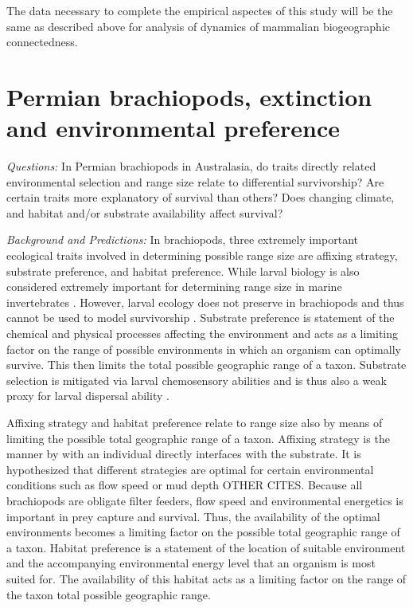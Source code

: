 \documentclass[12pt,letterpaper]{article}
\begin{document}
The data necessary to complete the empirical aspectes of this study will be the same as described above for analysis of dynamics of mammalian biogeographic connectedness.


\section{Permian brachiopods, extinction and environmental preference}

\textit{Questions:} In Permian brachiopods in Australasia, do traits directly related environmental selection and range size relate to differential survivorship? Are certain traits more explanatory of survival than others? Does changing climate, and habitat and/or substrate availability affect survival?

\textit{Background and Predictions:}
In brachiopods, three extremely important ecological traits involved in determining possible range size are affixing strategy, substrate preference, and habitat preference. While larval biology is also considered extremely important for determining range size in marine invertebrates \citep{Jablonski2006a,Jablonski1983}. However, larval ecology does not preserve in brachiopods and thus cannot be used to model survivorship \citep{Jablonski1983}. Substrate preference is statement of the chemical and physical processes affecting the environment and acts as a limiting factor on the range of possible environments in which an organism can optimally survive. This then limits the total possible geographic range of a taxon. Substrate selection is mitigated via larval chemosensory abilities and is thus also a weak proxy for larval dispersal ability \citep{Jablonski2006a,Jablonski1983}. 

Affixing strategy and habitat preference relate to range size also by means of limiting the possible total geographic range of a taxon. Affixing strategy is the manner by with an individual directly interfaces with the substrate. It is hypothesized that different strategies are optimal for certain environmental conditions such as flow speed or mud depth \citep{Alexander1977} OTHER CITES. Because all brachiopods are obligate filter feeders, flow speed and environmental energetics is important in prey capture and survival. Thus, the availability of the optimal environments becomes a limiting factor on the possible total geographic range of a taxon. Habitat preference is a statement of the location of suitable environment and the accompanying environmental energy level that an organism is most suited for. The availability of this habitat acts as a limiting factor on the range of the taxon total possible geographic range. 
\end{document}
